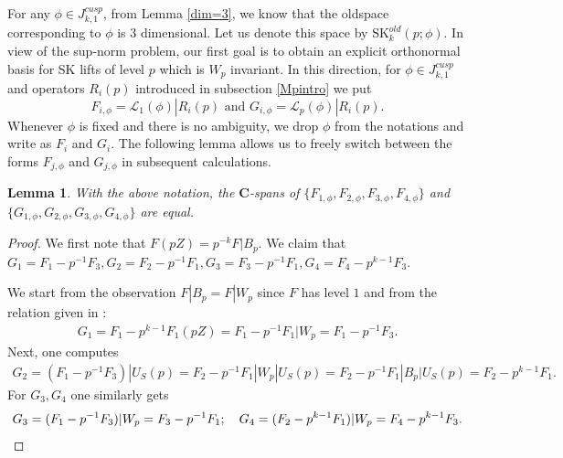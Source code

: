 \documentclass[11pt]{amsart}
\numberwithin{equation}{section}
\theoremstyle{plain}
\newtheorem{lem}[thm]{Lemma}
\theoremstyle{definition}
\newcommand{\C}{\mf C}
\newcommand{\mf}{\mathbf}
\newcommand{\mc}{\mathcal}
\newcommand{\mrm}{\mathrm}
\newcommand{\q}{\quad}
\newcommand{\skk}{\mrm{SK}_k}
\begin{document}
For any $\phi\in J_{k,1}^{cusp}$, from Lemma \ref{dim=3},  we know that the oldspace corresponding to $\phi$ is $3$ dimensional. Let us denote this space by $\skk^{old}(p; \phi)$. In view of the sup-norm problem, our first goal is to obtain an explicit orthonormal basis for SK lifts of level $p$ which is $W_p$ invariant. In this direction, for $\phi \in J_{k,1}^{cusp}$ and operators $R_i(p)$ introduced in subsection \ref{Mpintro} we put 
\begin{equation}
F_{i,\phi}= \mc L_1(\phi)|R_i(p) \text{ and } G_{i,\phi}= \mc L_p(\phi)|R_i(p).
\end{equation}
Whenever $\phi$ is fixed and there is no ambiguity, we drop $\phi$ from the notations and write as $F_i$ and $G_i$.
The following lemma allows us to freely switch between the forms $F_{j,\phi}$ and $G_{j,\phi}$ in subsequent calculations.
\begin{lem} \label{FG}
    With the above notation, the $\C$-spans of $\{ F_{1,\phi}, F_{2,\phi}, F_{3,\phi}, F_{4,\phi} \}$ and $\{ G_{1,\phi}, G_{2,\phi}, G_{3,\phi}, G_{4,\phi} \}$ are equal.
\end{lem}
\begin{proof}
We first note that $F(pZ) = p^{-k} F|B_p$. We claim that $G_1= F_1-p^{-1} F_3, G_2= F_2 - p^{-1} F_1, G_3= F_3 - p^{-1} F_1, G_4=F_4 - p^{k-1} F_3$.
 
We start from the observation $F|B_p = F|W_p$ since $F$ has level $1$ and from the relation given in \cite{Ibu-SK}:
\begin{align}\label{G1}
   G_1 = F_1 - p^{k-1} F_1(p Z) = F_1 - p^{-1} F_1 | W_p = F_1-p^{-1} F_3.
\end{align}
Next, one computes
    \begin{align}\label{G2}
        G_2= (F_1-p^{-1} F_3)|U_S(p) = F_2 - p^{-1} F_1|W_p|U_S(p) = F_2 - p^{-1} F_1|B_p|U_S(p) = F_2 - p^{k-1} F_1.
    \end{align}
For $G_3, G_4$ one similarly gets
    \begin{equation} \label{G3}
        G_3= (F_1-p^{-1} F_3)|W_p= F_3 - p^{-1} F_1; \q G_4 = (F_2 - p^{k-1} F_1)| W_p = F_4 - p^{k-1} F_3 . \qedhere
    \end{equation}
\end{proof}
\end{document}
